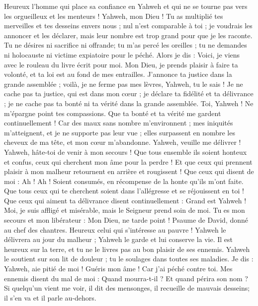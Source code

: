 \begin{multicols}{2}
Heureux l'homme qui place sa confiance en Yahweh et qui ne se tourne pas vers les orgueilleux et les menteurs !
Yahweh, mon Dieu ! Tu as multiplié tes merveilles et tes desseins envers nous ; nul n'est comparable à toi ; je voudrais les annoncer et les déclarer, mais leur nombre est trop grand pour que je les raconte.
Tu ne désires ni sacrifice ni offrande; tu m'as percé les oreilles ; tu ne demandes ni holocauste ni victime expiatoire pour le péché.
Alors je dis : Voici, je viens avec le rouleau du livre écrit pour moi.
Mon Dieu, je prends plaisir à faire ta volonté, et ta loi est au fond de mes entrailles.
J'annonce ta justice dans la grande assemblée ; voilà, je ne ferme pas mes lèvres, Yahweh, tu le sais !
Je ne cache pas ta justice, qui est dans mon cœur ; je déclare ta fidélité et ta délivrance ; je ne cache pas ta bonté ni ta vérité dans la grande assemblée.
Toi, Yahweh ! Ne m'épargne point tes compassions. Que ta bonté et ta vérité me gardent continuellement !
Car des maux sans nombre m'environnent ; mes iniquités m'atteignent, et je ne supporte pas leur vue ; elles surpassent en nombre les cheveux de ma tête, et mon cœur m'abandonne.
Yahweh, veuille me délivrer ! Yahweh, hâte-toi de venir à mon secours !
Que tous ensemble ils soient honteux et confus, ceux qui cherchent mon âme pour la perdre ! Et que ceux qui prennent plaisir à mon malheur retournent en arrière et rougissent !
Que ceux qui disent de moi : Ah ! Ah ! Soient consumés, en récompense de la honte qu'ils m'ont faite.
Que tous ceux qui te cherchent soient dans l'allégresse et se réjouissent en toi ! Que ceux qui aiment ta délivrance disent continuellement : Grand est Yahweh !
Moi, je suis affligé et misérable, mais le Seigneur prend soin de moi. Tu es mon secours et mon libérateur : Mon Dieu, ne tarde point !
\VerseOne{}Psaume de David, donné au chef des chantres.
Heureux celui qui s'intéresse au pauvre ! Yahweh le délivrera au jour du malheur ;
Yahweh le garde et lui conserve la vie. Il est heureux sur la terre, et tu ne le livres pas au bon plaisir de ses ennemis.
Yahweh le soutient sur son lit de douleur ; tu le soulages dans toutes ses maladies.
Je dis : Yahweh, aie pitié de moi ! Guéris mon âme ! Car j'ai péché contre toi.
Mes ennemis disent du mal de moi : Quand mourra-t-il ? Et quand périra son nom ?
Si quelqu'un vient me voir, il dit des mensonges, il recueille de mauvais desseins; il s'en va et il parle au-dehors.

\end{multicols}
